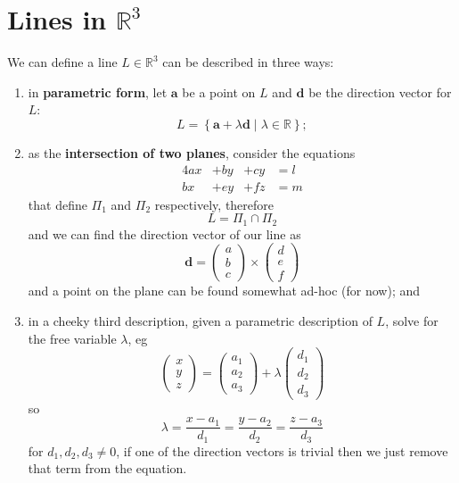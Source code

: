 \section{Lines in $\mathbb R^3$}

\begin{definition}
    We can define a line $L\in\mathbb R^3$ can be described in three ways:
    \begin{enumerate}
        \item in \textbf{parametric form}, let $\bm a$ be a point on $L$ and $\bm d$ be the direction vector for $L$:
        \[
            L=\left\{\bm a+\lambda\bm d\mid\lambda\in\mathbb R\right\};
        \]
        
        \item as the \textbf{intersection of two planes}, consider the equations
        \begin{alignat*}{4}
            ax&+by&+cy&=l\\
            bx&+ey&+fz&=m
        \end{alignat*}
        that define $\Pi_1$ and $\Pi_2$ respectively, therefore
        \[L=\Pi_1\cap\Pi_2\]
        and we can find the direction vector of our line as
        \[
            \bm d=
            \begin{pmatrix}
                a\\b\\c
            \end{pmatrix}
            \times
            \begin{pmatrix}
                d\\e\\f
            \end{pmatrix}
        \]
        and a point on the plane can be found somewhat ad-hoc (for now); and
        
        \item in a cheeky third description, given a parametric description of $L$, solve for the free variable $\lambda$, eg
        \[
            \begin{pmatrix}
                x\\y\\z
            \end{pmatrix}
            =
            \begin{pmatrix}
                a_1\\a_2\\a_3
            \end{pmatrix}
            +\lambda
            \begin{pmatrix}
                d_1\\d_2\\d_3
            \end{pmatrix}
        \]
        so
        \[
            \lambda=\dfrac{x-a_1}{d_1}=\dfrac{y-a_2}{d_2}=\dfrac{z-a_3}{d_3}
        \]
        for $d_1,d_2,d_3\neq0$, if one of the direction vectors is trivial then we just remove that term from the equation.
    \end{enumerate}
\end{definition}

